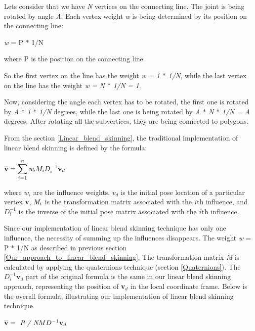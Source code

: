 \documentclass[times, 10pt,twocolumn]{article}
\begin{document}
Lets consider that we have \emph{N} vertices on the connecting line. The joint is being rotated by angle \emph{A}. Each vertex weight \emph{w} is being determined by its position on the connecting line:

\begin{center}
\emph{w} = P $\ast$ 1/N
\end{center}
where P is the position on the connecting line.

So the first vertex on the line has the weight \emph{w = 1 $\ast$ 1/N}, while the last vertex on the line has the weight \emph{w =  N $\ast$ 1/N = 1}.

Now, considering the angle each vertex has to be rotated, the first one is rotated by \emph{A $\ast$ 1 $\ast$ 1/N} degrees, while the last one is being rotated by \emph{A $\ast$ N $\ast$  1/N = A} degrees. After rotating all the subvertices, they are being connected to polygons.

\label{relation}

From the section \ref{Linear_blend_skinning}, the traditional implementation of linear blend skinning is defined by the formula:
\begin{center}
$ \overline{\textbf{v}} = \displaystyle\sum_{i=1}^n\emph{w}_{i}M_{i}D_{i}^{-1}\textbf{v}_{d} $
\end{center}
where $w_{i}$ are the influence weights, $v_{d}$ is the initial pose location of a
particular vertex \textbf{v}, $\emph{M}_{i}$ is the transformation matrix associated with
the $\emph{i}$th influence, and $D_{i}^{-1}$ is the inverse of the initial pose matrix
associated with the $\emph{i}$th influence.

Since our implementation of linear blend skinning technique has only one influence, the necessity of summing up the influences disappears. The weight \emph{w} = P $\ast$ 1/N as described in previous section \ref{Our_approach_to_linear_blend_skinning}. The transformation matrix \emph{M} is calculated by applying the quaternions technique (section \ref{Quaternions}). The $D_{i}^{-1}\textbf{v}_{d}$ part of the original formula is the same in our linear blend skinning approach, representing the position of \textbf{v$_{d}$} in the local coordinate frame. Below is the overall formula, illustrating our implementation of linear blend skinning technique.
\begin{center}
$ \overline{\textbf{v}} = \emph{ P / N}MD^{-1}\textbf{v}_{d} $
\end{center}
\end{document}
